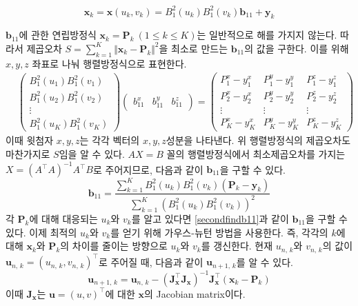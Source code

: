 \documentclass{gshs_thesis}
\theoremstyle{theorem}
\theoremstyle{lemma}
\theoremstyle{definition}
\begin{document}
$$ \mathbf{x}_k = \mathbf{x}(u_k, v_k) = B_1^2(u_k) B_1^2(v_k) \mathbf{b}_{11} + \mathbf{y}_k $$ 

$\mathbf{b}_{11}$에 관한 연립방정식 $\mathbf{x}_k = \mathbf{P}_k \ (1 \leq k \leq K)$는 일반적으로 해를 가지지 않는다. 따라서 제곱오차 $S = \sum_{k=1}^K \Vert \mathbf{x}_k - \mathbf{P}_k \Vert^2$을 최소로 만드는 $\mathbf{b}_{11}$의 값을 구한다. 이를 위해 $x, y, z$ 좌표로 나눠 행렬방정식으로 표현한다. 
\begin{align*}
	&\begin{pmatrix}
		B_1^2(u_1)B_1^2(v_1) \\ B_1^2(u_2)B_1^2(v_2) \\ \vdots \\ B_1^2(u_K)B_1^2(v_K)
	\end{pmatrix} \begin{pmatrix}
		b_{11}^x & b_{11}^y & b_{11}^z
	\end{pmatrix}
	= \begin{pmatrix}
		P_1^x-y_1^x & P_1^y-y_1^y & P_1^z-y_1^z \\ P_2^x-y_2^x & P_2^y-y_2^y & P_2^z-y_2^z \\ \vdots & \vdots & \vdots \\ P_K^x-y_K^x & P_K^y-y_K^y & P_K^z-y_K^z
	\end{pmatrix}
\end{align*}
이때 윗첨자 $x, y, z$는 각각 벡터의 $x, y, z$성분을 나타낸다. 위 행렬방정식의 제곱오차도 마찬가지로 $S$임을 알 수 있다. $AX = B$ 꼴의 행렬방정식에서 최소제곱오차를 가지는 $X = (A^\intercal A)^{-1} A^\intercal B$로 주어지므로, 다음과 같이 $\mathbf{b}_{11}$을 구할 수 있다. 
\begin{equation} \label{secondfindb11}
	\mathbf{b}_{11} = \frac{\sum_{k=1}^K B_1^2(u_k) B_1^2 (v_k) (\mathbf{P}_k - \mathbf{y}_k)}{\sum_{k=1}^K (B_1^2(u_k) B_1^2(v_k))^2}
\end{equation}
각 $\mathbf{P}_k$에 대해 대응되는 $u_k$와 $v_k$를 알고 있다면 \eqref{secondfindb11}과 같이 $\mathbf{b}_{11}$을 구할 수 있다. 이제 최적의 $u_k$와 $v_k$를 얻기 위해 가우스-뉴턴 방법을 사용한다. 즉, 각각의 $k$에 대해 $\mathbf{x}_k$와 $\mathbf{P}_k$의 차이를 줄이는 방향으로 $u_k$와 $v_k$를 갱신한다. 현재 $u_{n, \, k}$와 $v_{n, \, k}$의 값이 $\mathbf{u}_{n, \, k} = (u_{n, \, k}, v_{n, \, k})^\intercal$로 주어질 때, 다음과 같이 $\mathbf{u}_{n+1, \, k}$를 알 수 있다. 
\begin{equation} \label{rearrange}
	\mathbf{u}_{n+1, \, k} = \mathbf{u}_{n, \, k} - (\mathbf{J}_\mathbf{x}^\intercal \mathbf{J}_\mathbf{x})^{-1} \mathbf{J}_\mathbf{x}^\intercal (\mathbf{x}_k - \mathbf{P}_k)
\end{equation}
이때 $\mathbf{J}_\mathbf{x}$는 $\mathbf{u} = (u, v)^\intercal$에 대한 $\mathbf{x}$의 Jacobian matrix이다.
\end{document}
